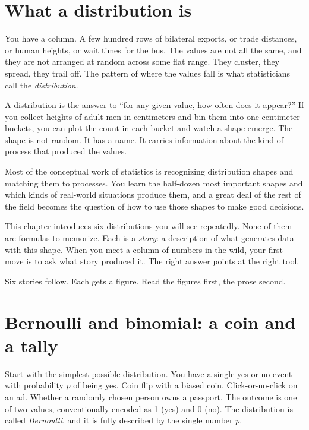 \documentclass[
  letterpaper,
  11pt,
  twoside,
  openany]{scrbook}
\begin{document}
\section{What a distribution is}\label{what-a-distribution-is}

You have a column. A few hundred rows of bilateral exports, or trade
distances, or human heights, or wait times for the bus. The values are
not all the same, and they are not arranged at random across some flat
range. They cluster, they spread, they trail off. The pattern of where
the values fall is what statisticians call the \emph{distribution}.

A distribution is the answer to ``for any given value, how often does it
appear?'' If you collect heights of adult men in centimeters and bin
them into one-centimeter buckets, you can plot the count in each bucket
and watch a shape emerge. The shape is not random. It has a name. It
carries information about the kind of process that produced the values.

Most of the conceptual work of statistics is recognizing distribution
shapes and matching them to processes. You learn the half-dozen most
important shapes and which kinds of real-world situations produce them,
and a great deal of the rest of the field becomes the question of how to
use those shapes to make good decisions.

This chapter introduces six distributions you will see repeatedly. None
of them are formulas to memorize. Each is a \emph{story}: a description
of what generates data with this shape. When you meet a column of
numbers in the wild, your first move is to ask what story produced it.
The right answer points at the right tool.

Six stories follow. Each gets a figure. Read the figures first, the
prose second.

\section{Bernoulli and binomial: a coin and a
tally}\label{bernoulli-and-binomial-a-coin-and-a-tally}

Start with the simplest possible distribution. You have a single
yes-or-no event with probability \(p\) of being yes. Coin flip with a
biased coin. Click-or-no-click on an ad. Whether a randomly chosen
person owns a passport. The outcome is one of two values, conventionally
encoded as 1 (yes) and 0 (no). The distribution is called
\emph{Bernoulli}, and it is fully described by the single number \(p\).
\end{document}
